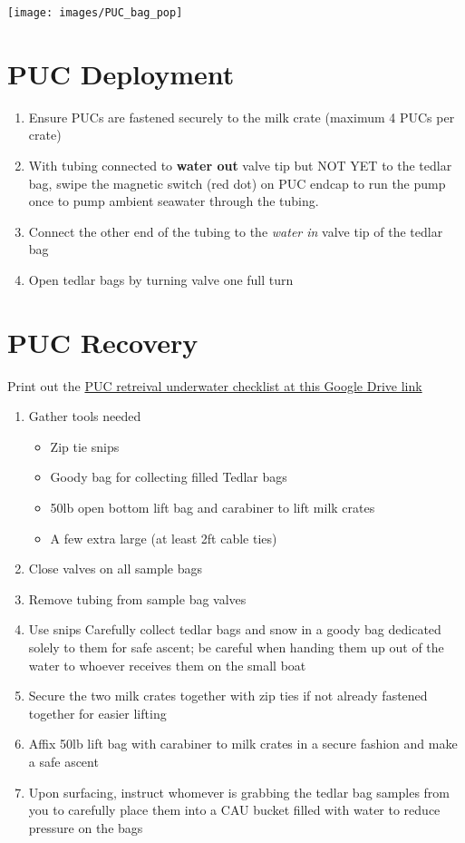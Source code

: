 \documentclass[]{book}
\providecommand{\tightlist}{%
  \setlength{\itemsep}{0pt}\setlength{\parskip}{0pt}}
\begin{document}
\texttt{[image: images/PUC\_bag\_pop]}

\hypertarget{puc-deployment}{%
\section{PUC Deployment}\label{puc-deployment}}

\begin{enumerate}
\def\labelenumi{\arabic{enumi}.}
\tightlist
\item
  Ensure PUCs are fastened securely to the milk crate (maximum 4 PUCs per crate)
\item
  With tubing connected to \textbf{water out} valve tip but NOT YET to the tedlar bag, swipe the magnetic switch (red dot) on PUC endcap to run the pump once to pump ambient seawater through the tubing.
\item
  Connect the other end of the tubing to the \emph{water in} valve tip of the tedlar bag
\item
  Open tedlar bags by turning valve one full turn
\end{enumerate}

\hypertarget{puc-recovery}{%
\section{PUC Recovery}\label{puc-recovery}}

Print out the \href{https://drive.google.com/drive/folders/1X6fAG4OIDs66Ji5xzYsX8JySqhkSs5k-}{PUC retreival underwater checklist at this Google Drive link}

\begin{enumerate}
\def\labelenumi{\arabic{enumi}.}
\tightlist
\item
  Gather tools needed

  \begin{itemize}
  \tightlist
  \item
    Zip tie snips
  \item
    Goody bag for collecting filled Tedlar bags
  \item
    50lb open bottom lift bag and carabiner to lift milk crates
  \item
    A few extra large (at least 2ft cable ties)
  \end{itemize}
\item
  Close valves on all sample bags
\item
  Remove tubing from sample bag valves
\item
  Use snips Carefully collect tedlar bags and snow in a goody bag dedicated solely to them for safe ascent; be careful when handing them up out of the water to whoever receives them on the small boat
\item
  Secure the two milk crates together with zip ties if not already fastened together for easier lifting
\item
  Affix 50lb lift bag with carabiner to milk crates in a secure fashion and make a safe ascent
\item
  Upon surfacing, instruct whomever is grabbing the tedlar bag samples from you to carefully place them into a CAU bucket filled with water to reduce pressure on the bags
\end{enumerate}
\end{document}
